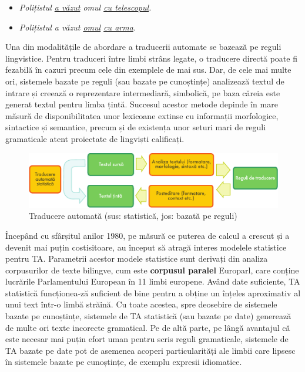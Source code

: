 \documentclass[]{../../metanetpaper}
\begin{document}
\begin{multicols}{2}
\begin{itemize}
\item \textit{Polițistul \underline{a văzut} omul \underline{cu telescopul}.}
\item \textit{Polițistul a văzut \underline{omul} \underline{cu arma}.}
\end{itemize}

Una din modalitățile de abordare a traducerii automate se bazează pe reguli lingvistice. Pentru traduceri între limbi strâns legate, o traducere directă poate fi fezabilă în cazuri precum cele din exemplele de mai sus. Dar, de cele mai multe ori, sistemele bazate pe reguli (sau bazate pe cunoștințe) analizează textul de intrare și creează o reprezentare intermediară, simbolică, pe baza căreia este generat textul pentru limba țintă. Succesul acestor metode depinde în mare măsură de disponibilitatea unor lexicoane extinse cu informații morfologice, sintactice și semantice, precum și de existența unor seturi mari de reguli gramaticale atent proiectate de lingviști calificați.

\begin{figure}[htb]
\center
\includegraphics[width=\textwidth]{../_media/romanian/machine_translation}
\caption{Traducere automată (sus: statistică, jos: bazată pe reguli)}
\label{fig:mtarch_de}
\end{figure}

Începând cu sfârșitul anilor 1980, pe măsură ce puterea de calcul a crescut și a devenit mai puțin costisitoare, au început să atragă interes modelele statistice pentru TA. Parametrii acestor modele statistice sunt derivați din analiza corpusurilor de texte bilingve, cum este \textbf{corpusul paralel} Europarl, care conține lucrările Parlamentului European în 11 limbi europene. Având date suficiente, TA statistică funcționea-\newline ză suficient de bine pentru a obține un înțeles aproximativ al unui text într-o limbă străină. Cu toate acestea, spre deosebire de sistemele bazate pe cunoștințe, sistemele de TA statistică (sau bazate pe date) generează de multe ori texte incorecte gramatical. Pe de altă parte, pe lângă avantajul că este necesar mai puțin efort uman pentru scris reguli gramaticale, sistemele de TA bazate pe date pot de asemenea acoperi particularități ale limbii care lipsesc în sistemele bazate pe cunoștințe, de exemplu expresii idiomatice.


\end{multicols}
\end{document}
